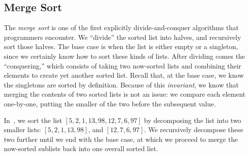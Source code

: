 \newpage
\subsection{Merge Sort}

The \emph{merge sort} is one of the first explicitly divide-and-conquer algorithms that programmers encounter. 
We ``divide'' the sorted list into halves, and recursively sort those halves. 
The base case is when the list is either empty or a singleton, since we certainly know how to sort these kinds of lists. 
After dividing comes the ``conquering,'' which consists of taking two now-sorted lists and combining their elements to create yet another sorted list. 
Recall that, at the base case, we know the singletons are sorted by definition. 
Because of this \emph{invariant}, we know that merging the contents of two sorted lists is not an issue: we compare each element one-by-one, putting the smaller of the two before the subsequent value.

In~, we sort the list $[5, 2, 1, 13, 98, 12, 7, 6, 97]$ by decomposing the list into two smaller lists: $[5, 2, 1, 13, 98]$, and $[12, 7, 6, 97]$. 
We recursively decompose these two further until we end with the base case, at which we proceed to merge the now-sorted sublists back into one overall sorted list.

